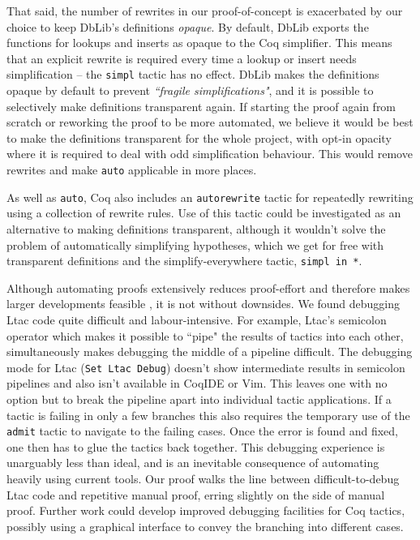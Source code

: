 \documentclass[]{unswthesis}
\let\c\texttt
\let\i\textit
\begin{document}
That said, the number of rewrites in our proof-of-concept is exacerbated by our choice to keep DbLib's definitions \i{opaque}. By default, DbLib exports the functions for lookups and inserts as opaque to the Coq simplifier. This means that an explicit rewrite is required every time a lookup or insert needs simplification -- the \c{simpl} tactic has no effect. DbLib makes the definitions opaque by default to prevent \i{``fragile simplifications"}, and it is possible to selectively make definitions transparent again. If starting the proof again from scratch or reworking the proof to be more automated, we believe it would be best to make the definitions transparent for the whole project, with opt-in opacity where it is required to deal with odd simplification behaviour. This would remove rewrites and make \c{auto} applicable in more places.

As well as \c{auto}, Coq also includes an \c{autorewrite} tactic for repeatedly rewriting using a collection of rewrite rules. Use of this tactic could be investigated as an alternative to making definitions transparent, although it wouldn't solve the problem of automatically simplifying hypotheses, which we get for free with transparent definitions and the simplify-everywhere tactic, \c{simpl in *}.

Although automating proofs extensively reduces proof-effort and therefore makes larger developments feasible \cite{cpdt}, it is not without downsides. We found debugging Ltac code quite difficult and labour-intensive. For example, Ltac's semicolon operator which makes it possible to ``pipe" the results of tactics into each other, simultaneously makes debugging the middle of a pipeline difficult. The debugging mode for Ltac (\c{Set Ltac Debug}) doesn't show intermediate results in semicolon pipelines and also isn't available in CoqIDE or Vim. This leaves one with no option but to break the pipeline apart into individual tactic applications. If a tactic is failing in only a few branches this also requires the temporary use of the \c{admit} tactic to navigate to the failing cases. Once the error is found and fixed, one then has to glue the tactics back together. This debugging experience is unarguably less than ideal, and is an inevitable consequence of automating heavily using current tools. Our proof walks the line between difficult-to-debug Ltac code and repetitive manual proof, erring slightly on the side of manual proof. Further work could develop improved debugging facilities for Coq tactics, possibly using a graphical interface to convey the branching into different cases.
\end{document}
